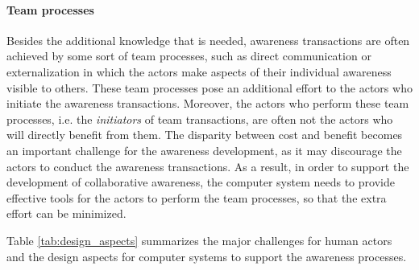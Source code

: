 \paragraph*{Team processes} %
\label{par:team_processes}
Besides the additional knowledge that is needed, awareness transactions are often achieved by some sort of team processes, such as direct communication or externalization in which the actors make aspects of their individual awareness visible to others. These team processes pose an additional effort to the actors who initiate the awareness transactions. Moreover, the actors who perform these team processes, i.e. the \emph{initiators} of team transactions, are often not the actors who will directly benefit from them. The disparity between cost and benefit \cite{Grudin1994} becomes an important challenge for the awareness development, as it may discourage the actors to conduct the awareness transactions. As a result, in order to support the development of collaborative awareness, the computer system needs to provide effective tools for the actors to perform the team processes, so that the extra effort can be minimized.

Table \ref{tab:design_aspects} summarizes the major challenges for human actors and the design aspects for computer systems to support the awareness processes.


